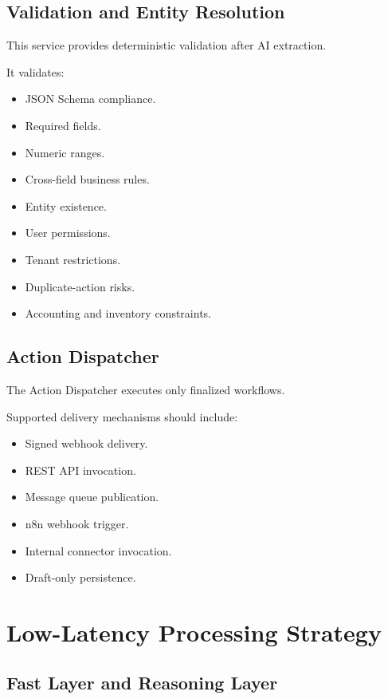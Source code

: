 \documentclass[11pt,a4paper]{article}
\begin{document}
\subsection{Validation and Entity Resolution}

This service provides deterministic validation after AI extraction.

It validates:

\begin{itemize}
\item JSON Schema compliance.
\item Required fields.
\item Numeric ranges.
\item Cross-field business rules.
\item Entity existence.
\item User permissions.
\item Tenant restrictions.
\item Duplicate-action risks.
\item Accounting and inventory constraints.
\end{itemize}

\subsection{Action Dispatcher}

The Action Dispatcher executes only finalized workflows.

Supported delivery mechanisms should include:

\begin{itemize}
\item Signed webhook delivery.
\item REST API invocation.
\item Message queue publication.
\item n8n webhook trigger.
\item Internal connector invocation.
\item Draft-only persistence.
\end{itemize}

\section{Low-Latency Processing Strategy}

\subsection{Fast Layer and Reasoning Layer}
\end{document}
